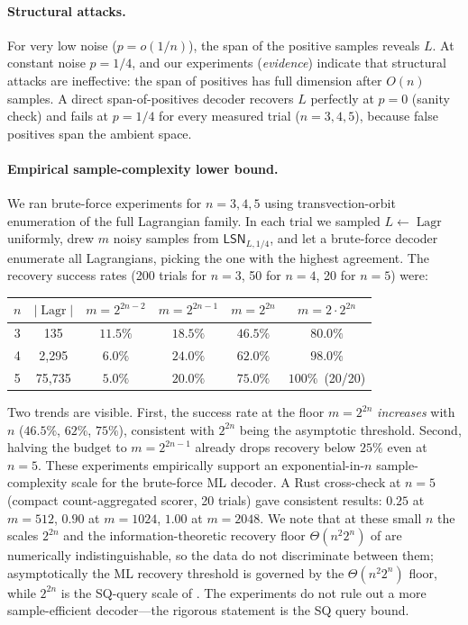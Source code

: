 \documentclass[11pt,a4paper]{article}
\theoremstyle{plain}
\theoremstyle{definition}
\DeclareMathOperator{\Lagr}{Lagr}
\newcommand{\LSN}{\mathsf{LSN}}
\begin{document}
\paragraph{Structural attacks.}
For very low noise ($p = o(1/n)$), the span of the positive samples reveals $L$. At constant noise $p=1/4$, \cite{LPQR26} and our experiments (\emph{evidence}) indicate that structural attacks are ineffective: the span of positives has full dimension after $O(n)$ samples.  A direct span-of-positives decoder recovers $L$ perfectly at $p=0$ (sanity check) and fails at $p=1/4$ for every measured trial ($n=3,4,5$), because false positives span the ambient space.

\paragraph{Empirical sample-complexity lower bound.}
We ran brute-force experiments for $n=3,4,5$ using transvection-orbit enumeration of the full Lagrangian family.  In each trial we sampled $L\leftarrow\Lagr$ uniformly, drew $m$ noisy samples from $\LSN_{L,1/4}$, and let a brute-force decoder enumerate all Lagrangians, picking the one with the highest agreement.  The recovery success rates (200 trials for $n=3$, 50 for $n=4$, 20 for $n=5$) were:
\begin{center}
\begin{tabular}{@{}cccccc@{}}
\toprule
$n$ & $|\Lagr|$ & $m=2^{2n-2}$ & $m=2^{2n-1}$ & $m=2^{2n}$ & $m=2\cdot2^{2n}$ \\
\midrule
3 & 135 & $11.5\%$ & $18.5\%$ & $46.5\%$ & $80.0\%$ \\
4 & 2{,}295 & $6.0\%$ & $24.0\%$ & $62.0\%$ & $98.0\%$ \\
5 & 75{,}735 & $5.0\%$ & $20.0\%$ & $75.0\%$ & $100\%$~(20/20) \\
\bottomrule
\end{tabular}
\end{center}
Two trends are visible.  First, the success rate at the floor $m=2^{2n}$ \emph{increases} with $n$ ($46.5\%$, $62\%$, $75\%$), consistent with $2^{2n}$ being the asymptotic threshold.  Second, halving the budget to $m=2^{2n-1}$ already drops recovery below $25\%$ even at $n=5$.  These experiments empirically support an exponential-in-$n$ sample-complexity scale for the brute-force ML decoder.  A Rust cross-check at $n=5$ (compact count-aggregated scorer, 20 trials) gave consistent results: $0.25$ at $m=512$, $0.90$ at $m=1024$, $1.00$ at $m=2048$.  We note that at these small $n$ the scales $2^{2n}$ and the information-theoretic recovery floor $\Theta(n^2 2^n)$ of  are numerically indistinguishable, so the data do not discriminate between them; asymptotically the ML recovery threshold is governed by the $\Theta(n^2 2^n)$ floor, while $2^{2n}$ is the SQ-query scale of . The experiments do not rule out a more sample-efficient decoder---the rigorous statement is the SQ query bound.
\end{document}
